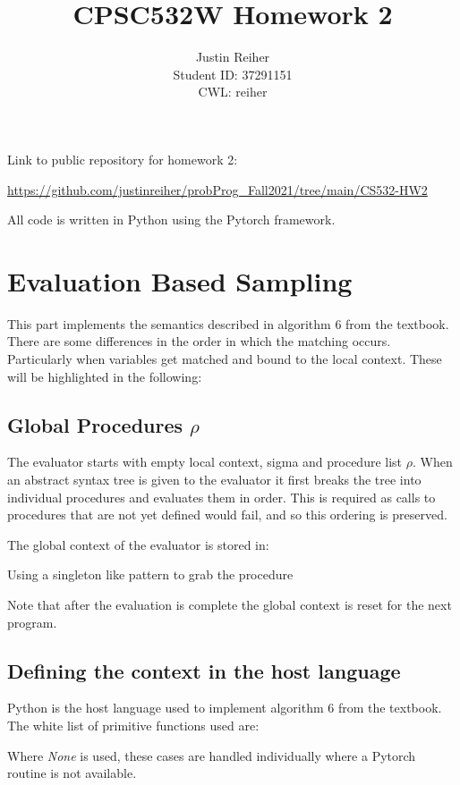 \documentclass[]{article}
\title{CPSC532W Homework 2}
\author{Justin Reiher\\ Student ID: 37291151\\ CWL: reiher}
\date{}
\begin{document}
\maketitle

Link to public repository for homework 2:
\begin{center}
	\url{https://github.com/justinreiher/probProg_Fall2021/tree/main/CS532-HW2}
\end{center}
All code is written in Python using the Pytorch framework.
\section{Evaluation Based Sampling}
This part implements the semantics described in algorithm 6 from the textbook. There are some differences in the order in which the matching occurs. Particularly when variables get matched and bound to the local context. These will be highlighted in the following:
\subsection{Global Procedures $\rho$}
The evaluator starts with empty local context, sigma and procedure list $\rho$. When an abstract syntax tree is given to the evaluator it first breaks the tree into individual procedures and evaluates them in order. This is required as calls to procedures that are not yet defined would fail, and so this ordering is preserved.

The global context of the evaluator is stored in:


Using a singleton like pattern to grab the procedure


Note that after the evaluation is complete the global context is reset for the next program.

\subsection{Defining the context in the host language}
Python is the host language used to implement algorithm 6 from the textbook. The white list of primitive functions used are:



Where \emph{None} is used, these cases are handled individually where a Pytorch routine is not available.
\end{document}
